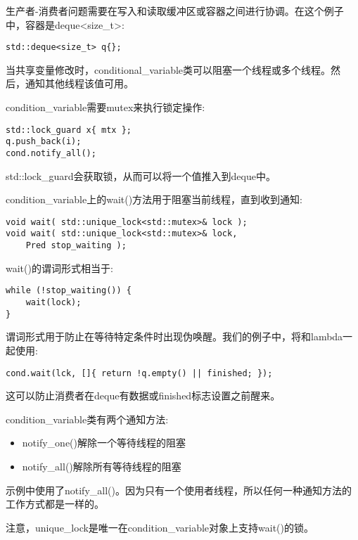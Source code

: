 生产者-消费者问题需要在写入和读取缓冲区或容器之间进行协调。在这个例子中，容器是deque<size\_t>:

\begin{lstlisting}[style=styleCXX]
std::deque<size_t> q{};
\end{lstlisting}

当共享变量修改时，conditional\_variable类可以阻塞一个线程或多个线程。然后，通知其他线程该值可用。

condition\_variable需要mutex来执行锁定操作:

\begin{lstlisting}[style=styleCXX]
std::lock_guard x{ mtx };
q.push_back(i);
cond.notify_all();
\end{lstlisting}

std::lock\_guard会获取锁，从而可以将一个值推入到deque中。

condition\_variable上的wait()方法用于阻塞当前线程，直到收到通知:

\begin{lstlisting}[style=styleCXX]
void wait( std::unique_lock<std::mutex>& lock );
void wait( std::unique_lock<std::mutex>& lock,
	Pred stop_waiting );
\end{lstlisting}

wait()的谓词形式相当于:

\begin{lstlisting}[style=styleCXX]
while (!stop_waiting()) {
	wait(lock);
}
\end{lstlisting}

谓词形式用于防止在等待特定条件时出现伪唤醒。我们的例子中，将和lambda一起使用:

\begin{lstlisting}[style=styleCXX]
cond.wait(lck, []{ return !q.empty() || finished; });
\end{lstlisting}

这可以防止消费者在deque有数据或finished标志设置之前醒来。

condition\_variable类有两个通知方法:

\begin{itemize}
\item 
notify\_one()解除一个等待线程的阻塞

\item 
notify\_all()解除所有等待线程的阻塞
\end{itemize}

示例中使用了notify\_all()。因为只有一个使用者线程，所以任何一种通知方法的工作方式都是一样的。

\begin{tcolorbox}[colback=webgreen!5!white,colframe=webgreen!75!black,title=Note]
注意，unique\_lock是唯一在condition\_variable对象上支持wait()的锁。
\end{tcolorbox}






